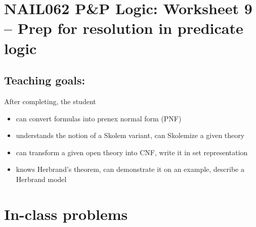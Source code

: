 \section*{NAIL062 P\&P Logic: Worksheet 9 -- Prep for resolution in predicate logic}


\subsection*{Teaching goals:} After completing, the student

    \begin{itemize}\setlength{\itemsep}{0pt}
        \item can convert formulas into prenex normal form (PNF)
        \item understands the notion of a Skolem variant, can Skolemize a given theory
        \item can transform a given open theory into CNF, write it in set representation
        \item knows Herbrand's theorem, can demonstrate it on an example, describe a Herbrand model
    \end{itemize}

    

\section*{In-class problems}


